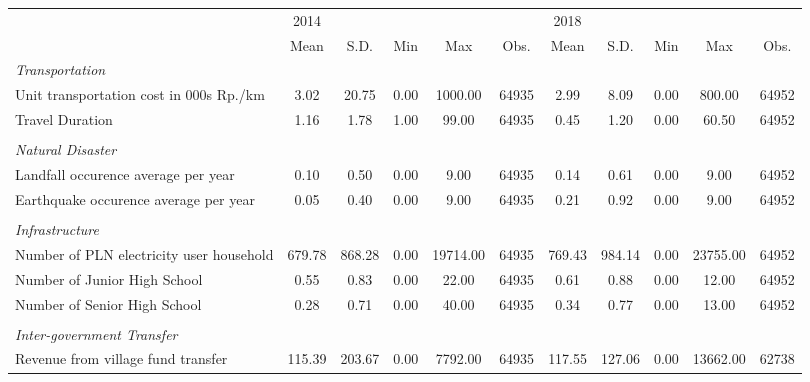 \begin{tabular}{l*{2}{ccccc}}
\toprule
                &     2014&         &         &         &         &     2018&         &         &         &         \\
                &     Mean&     S.D.&      Min&      Max&     Obs.&     Mean&     S.D.&      Min&      Max&     Obs.\\
\midrule
\emph{Transportation}&         &         &         &         &         &         &         &         &         &         \\
\hspace{0.25cm} Unit transportation cost in 000s Rp./km&     3.02&    20.75&     0.00&  1000.00&    64935&     2.99&     8.09&     0.00&   800.00&    64952\\
\hspace{0.25cm} Travel Duration&     1.16&     1.78&     1.00&    99.00&    64935&     0.45&     1.20&     0.00&    60.50&    64952\\
\vspace{0.05em} \\ \emph{Natural Disaster}&         &         &         &         &         &         &         &         &         &         \\
\hspace{0.25cm} Landfall occurence average per year&     0.10&     0.50&     0.00&     9.00&    64935&     0.14&     0.61&     0.00&     9.00&    64952\\
\hspace{0.25cm} Earthquake occurence average per year&     0.05&     0.40&     0.00&     9.00&    64935&     0.21&     0.92&     0.00&     9.00&    64952\\
\vspace{0.05em} \\ \emph{Infrastructure}&         &         &         &         &         &         &         &         &         &         \\
\hspace{0.25cm} Number of PLN electricity user household&   679.78&   868.28&     0.00& 19714.00&    64935&   769.43&   984.14&     0.00& 23755.00&    64952\\
\hspace{0.25cm} Number of Junior High School&     0.55&     0.83&     0.00&    22.00&    64935&     0.61&     0.88&     0.00&    12.00&    64952\\
\hspace{0.25cm} Number of Senior High School&     0.28&     0.71&     0.00&    40.00&    64935&     0.34&     0.77&     0.00&    13.00&    64952\\
\vspace{0.05em} \\ \emph{Inter-government Transfer}&         &         &         &         &         &         &         &         &         &         \\
\hspace{0.25cm} Revenue from village fund transfer&   115.39&   203.67&     0.00&  7792.00&    64935&   117.55&   127.06&     0.00& 13662.00&    62738\\
\bottomrule
\end{tabular}
